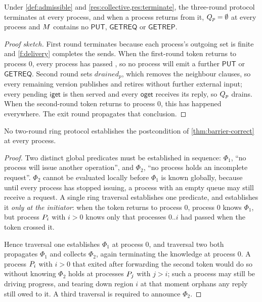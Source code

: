 \begin{theorem}\label{thm:barrier-correct}
Under \cref{def:admissible} and \cref{res:collective,res:terminate}, the
three-round protocol terminates at every process, and when a process returns from
it, $Q_{p} = \emptyset$ at every process and $M$ contains no
$\mathsf{PUT}$, $\mathsf{GETREQ}$ or $\mathsf{GETREP}$.
\end{theorem}

\begin{proof}[Proof sketch]
First round terminates because each process's outgoing set is finite and
\ref{f:delivery} completes the sends. When the first-round token returns to process $0$,
every process has passed , so no process will emit a further
$\mathsf{PUT}$ or $\mathsf{GETREQ}$. Second round sets $\mathit{drained}_p$, which
removes the neighbour clauses, so every remaining version publishes and
retires without further external input; every pending $\mathsf{iget}$ is then
served and every $\mathsf{oget}$ receives its reply, so $Q_{p}$ drains.
When the second-round token returns to process $0$, this has happened everywhere. The exit
round propagates that conclusion.
\end{proof}

\begin{proposition}\label{thm:barrier-three-rounds}
No two-round ring protocol establishes the postcondition of
\cref{thm:barrier-correct} at every process.
\end{proposition}

\begin{proof}
Two distinct global predicates must be established in sequence:
$\Phi_1$, ``no process will issue another operation'', and $\Phi_2$, ``no process
holds an incomplete request''. $\Phi_2$ cannot be evaluated locally before
$\Phi_1$ is known globally, because until every process has stopped issuing, a
process with an empty queue may still receive a request. A single ring traversal
establishes one predicate, and establishes it \emph{only at the initiator}:
when the token returns to process $0$, process $0$ knows $\Phi_1$, but process $P_{i}$ with $i > 0$
knows only that processes $0..i$ had passed when the token crossed it.

Hence traversal one establishes $\Phi_1$ at process $0$, and traversal two both
propagates $\Phi_1$ and collects $\Phi_2$, again terminating the knowledge at
process $0$. A process $P_{i}$ with $i > 0$ that exited after forwarding the second token would
do so without knowing $\Phi_2$ holds at processes $P_{j}$ with $j > i$; such a process may still
be driving progress, and tearing down \gls{region} $i$ at that moment orphans any
reply still owed to it. A third traversal is required to announce $\Phi_2$.
\end{proof}

